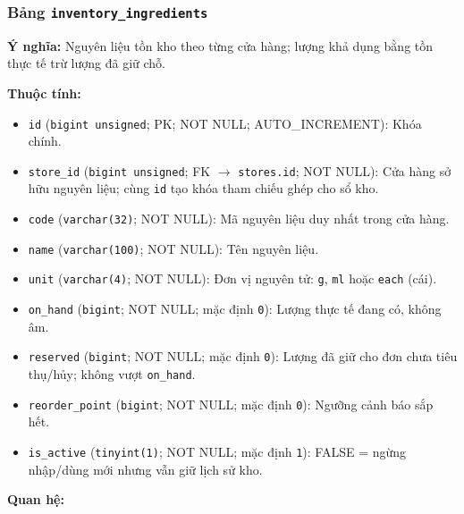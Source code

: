 \subsubsection{Bảng \texttt{inventory\_ingredients}}

\textbf{Ý nghĩa:} Nguyên liệu tồn kho theo từng cửa hàng; lượng khả dụng bằng tồn thực tế trừ lượng đã giữ chỗ.\par

\textbf{Thuộc tính:}

\begin{itemize}

\item \texttt{id} (\texttt{bigint unsigned}; PK; NOT NULL; AUTO_INCREMENT): Khóa chính.

\item \texttt{store\_id} (\texttt{bigint unsigned}; FK $\rightarrow$ \texttt{stores.id}; NOT NULL): Cửa hàng sở hữu nguyên liệu; cùng \texttt{id} tạo khóa tham chiếu ghép cho sổ kho.

\item \texttt{code} (\texttt{varchar(32)}; NOT NULL): Mã nguyên liệu duy nhất trong cửa hàng.

\item \texttt{name} (\texttt{varchar(100)}; NOT NULL): Tên nguyên liệu.

\item \texttt{unit} (\texttt{varchar(4)}; NOT NULL): Đơn vị nguyên tử: \texttt{g}, \texttt{ml} hoặc \texttt{each} (cái).

\item \texttt{on\_hand} (\texttt{bigint}; NOT NULL; mặc định \texttt{0}): Lượng thực tế đang có, không âm.

\item \texttt{reserved} (\texttt{bigint}; NOT NULL; mặc định \texttt{0}): Lượng đã giữ cho đơn chưa tiêu thụ/hủy; không vượt \texttt{on\_hand}.

\item \texttt{reorder\_point} (\texttt{bigint}; NOT NULL; mặc định \texttt{0}): Ngưỡng cảnh báo sắp hết.

\item \texttt{is\_active} (\texttt{tinyint(1)}; NOT NULL; mặc định \texttt{1}): FALSE = ngừng nhập/dùng mới nhưng vẫn giữ lịch sử kho.

\end{itemize}

\textbf{Quan hệ:}

